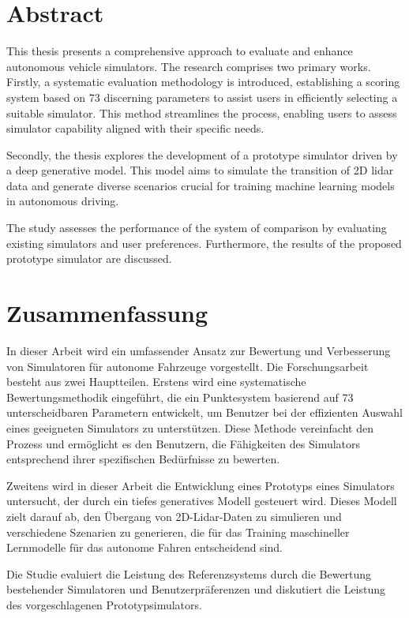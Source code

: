 \documentclass[12pt,twoside,a4paper,parskip]{scrbook} %
\begin{document}

\section*{Abstract}
This thesis presents a comprehensive approach to evaluate and enhance autonomous vehicle simulators. The research comprises two primary works. Firstly, a systematic evaluation methodology is introduced, establishing a scoring system based on 73 discerning parameters to assist users in efficiently selecting a suitable simulator. This method streamlines the process, enabling users to assess simulator capability aligned with their specific needs.

Secondly, the thesis explores the development of a prototype simulator driven by a deep generative model. This model aims to simulate the transition of 2D lidar data and generate diverse scenarios crucial for training machine learning models in autonomous driving. 

The study assesses the performance of the system of comparison by evaluating existing simulators and user preferences. Furthermore, the results of the proposed prototype simulator are discussed.


\section*{Zusammenfassung}
In dieser Arbeit wird ein umfassender Ansatz zur Bewertung und Verbesserung von Simulatoren für autonome Fahrzeuge vorgestellt. Die Forschungsarbeit besteht aus zwei Hauptteilen. Erstens wird eine systematische Bewertungsmethodik eingeführt, die ein Punktesystem basierend auf 73 unterscheidbaren Parametern entwickelt, um Benutzer bei der effizienten Auswahl eines geeigneten Simulators zu unterstützen. Diese Methode vereinfacht den Prozess und ermöglicht es den Benutzern, die Fähigkeiten des Simulators entsprechend ihrer spezifischen Bedürfnisse zu bewerten.

Zweitens wird in dieser Arbeit die Entwicklung eines Prototyps eines Simulators untersucht, der durch ein tiefes generatives Modell gesteuert wird. Dieses Modell zielt darauf ab, den Übergang von 2D-Lidar-Daten zu simulieren und verschiedene Szenarien zu generieren, die für das Training maschineller Lernmodelle für das autonome Fahren entscheidend sind. 

Die Studie evaluiert die Leistung des Referenzsystems durch die Bewertung bestehender Simulatoren und Benutzerpräferenzen und diskutiert die Leistung des vorgeschlagenen Prototypsimulators.
\end{document}
